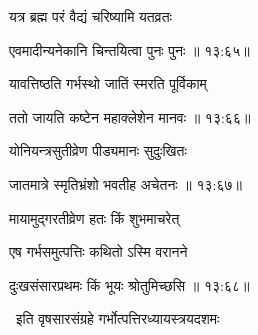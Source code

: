 {\devanagarifont यत्र ब्रह्म परं वैद्यं चरिष्यामि यतव्रतः \thinspace{\dandab} \dontdisplaylinenum }%


{\devanagarifont एवमादीन्यनेकानि चिन्तयित्वा पुनः पुनः {॥ १३:६५॥} \veg\dontdisplaylinenum }%
 
{\devanagarifont यावत्तिष्ठति गर्भस्थो जातिं स्मरति पूर्विकाम् \thinspace{\dandab} \dontdisplaylinenum }%


{\devanagarifont ततो जायति कष्टेन महाक्लेशेन मानवः {॥ १३:६६॥} \veg\dontdisplaylinenum }%
 
{\devanagarifont योनियन्त्रसुतीव्रेण पीड्यमानः सुदुःखितः \thinspace{\dandab} \dontdisplaylinenum }%


{\devanagarifont जातमात्रे स्मृतिभ्रंशो भवतीह अचेतनः {॥ १३:६७॥} \veg\dontdisplaylinenum }%

{\devanagarifont मायामुद्गरतीव्रेण हतः किं शुभमाचरेत् \thinspace{\dandab} \dontdisplaylinenum }%

{\devanagarifont एष गर्भसमुत्पत्तिः कथितो ऽस्मि वरानने  \danda\dontdisplaylinenum }%
 

{\devanagarifont दुःखसंसारप्रथमः किं भूयः श्रोतुमिच्छसि {॥ १३:६८॥} \veg\dontdisplaylinenum }%

{\devanagarifont 
\jump
\begin{center}
\ketdanda~इति वृषसारसंग्रहे गर्भोत्पत्तिरध्यायस्त्रयदशमः~\ketdanda
\end{center}
\dontdisplaylinenum\vers  }%
\bekveg\szamveg
\vfill
\phpspagebreak

